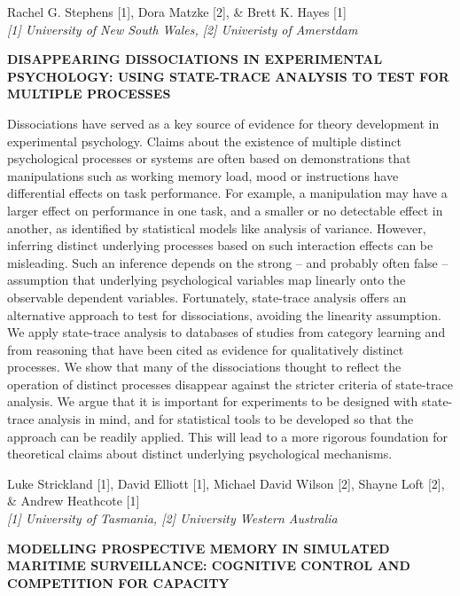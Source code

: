 \documentclass[]{article}
\begin{document}
Rachel G. Stephens {[}1{]}, Dora Matzke {[}2{]}, \& Brett K. Hayes
{[}1{]}\\
\emph{{[}1{]} University of New South Wales, {[}2{]} Univeristy of
Amerstdam}

\textbf{DISAPPEARING DISSOCIATIONS IN EXPERIMENTAL PSYCHOLOGY: USING
STATE-TRACE ANALYSIS TO TEST FOR MULTIPLE PROCESSES}

Dissociations have served as a key source of evidence for theory
development in experimental psychology. Claims about the existence of
multiple distinct psychological processes or systems are often based on
demonstrations that manipulations such as working memory load, mood or
instructions have differential effects on task performance. For example,
a manipulation may have a larger effect on performance in one task, and
a smaller or no detectable effect in another, as identified by
statistical models like analysis of variance. However, inferring
distinct underlying processes based on such interaction effects can be
misleading. Such an inference depends on the strong -- and probably
often false -- assumption that underlying psychological variables map
linearly onto the observable dependent variables. Fortunately,
state-trace analysis offers an alternative approach to test for
dissociations, avoiding the linearity assumption. We apply state-trace
analysis to databases of studies from category learning and from
reasoning that have been cited as evidence for qualitatively distinct
processes. We show that many of the dissociations thought to reflect the
operation of distinct processes disappear against the stricter criteria
of state-trace analysis. We argue that it is important for experiments
to be designed with state-trace analysis in mind, and for statistical
tools to be developed so that the approach can be readily applied. This
will lead to a more rigorous foundation for theoretical claims about
distinct underlying psychological mechanisms.\\
\pagebreak  

Luke Strickland {[}1{]}, David Elliott {[}1{]}, Michael David Wilson
{[}2{]}, Shayne Loft {[}2{]}, \& Andrew Heathcote {[}1{]}\\
\emph{{[}1{]} University of Tasmania, {[}2{]} University Western
Australia}

\textbf{MODELLING PROSPECTIVE MEMORY IN SIMULATED MARITIME SURVEILLANCE:
COGNITIVE CONTROL AND COMPETITION FOR CAPACITY}
\end{document}
